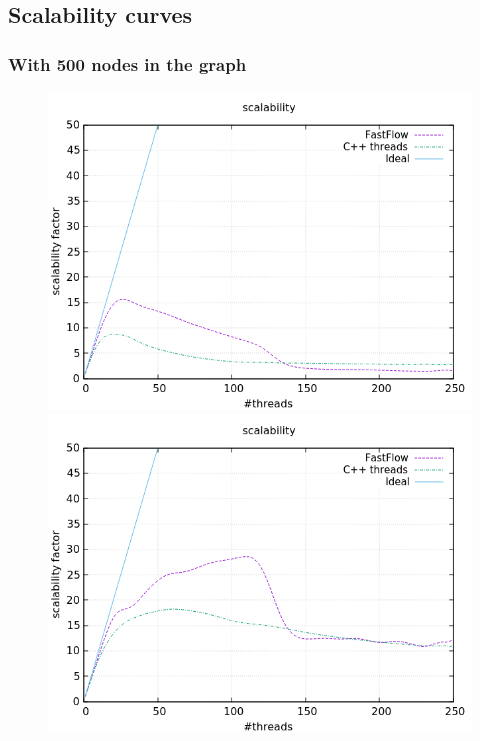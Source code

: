 \documentclass[a4paper,10pt]{article}
\begin{document}
	\subsection{Scalability curves}
		\subsubsection{With 500 nodes in the graph}
		\begin{figure}[H]
			\centering
			\begin{minipage}[t]{0.32\linewidth}
				\includegraphics[width=\linewidth]{BenchMarkTSP/scalability/500/SC500500_zoom.png}
				\subcaption{}
			\end{minipage}%
			\begin{minipage}[t]{0.32\linewidth}
				\includegraphics[width=\linewidth]{BenchMarkTSP/scalability/500/SC5005000_zoom.png}

\end{minipage}
\end{figure}
\end{document}
